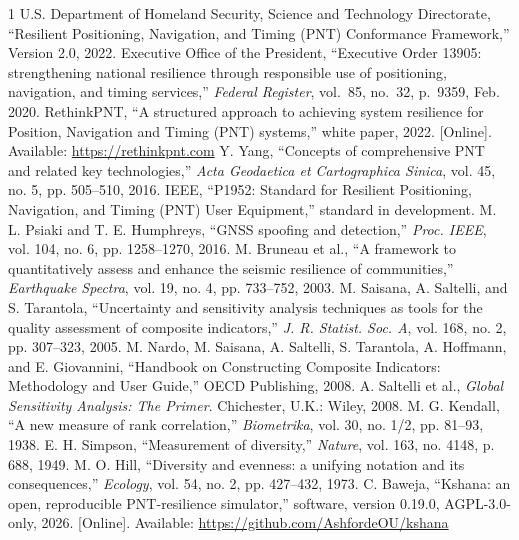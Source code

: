 \documentclass[conference]{IEEEtran}
\begin{document}
\begin{thebibliography}{1}
 U.S. Department of Homeland Security, Science and Technology Directorate, ``Resilient Positioning, Navigation, and Timing (PNT) Conformance Framework,'' Version 2.0, 2022.
 Executive Office of the President, ``Executive Order 13905: strengthening national resilience through responsible use of positioning, navigation, and timing services,'' \emph{Federal Register}, vol.~85, no.~32, p.~9359, Feb. 2020.
 RethinkPNT, ``A structured approach to achieving system resilience for Position, Navigation and Timing (PNT) systems,'' white paper, 2022. [Online]. Available: \url{https://rethinkpnt.com}
 Y. Yang, ``Concepts of comprehensive PNT and related key technologies,'' \emph{Acta Geodaetica et Cartographica Sinica}, vol. 45, no. 5, pp. 505--510, 2016.
 IEEE, ``P1952: Standard for Resilient Positioning, Navigation, and Timing (PNT) User Equipment,'' standard in development.
 M. L. Psiaki and T. E. Humphreys, ``GNSS spoofing and detection,'' \emph{Proc. IEEE}, vol. 104, no. 6, pp. 1258--1270, 2016.
 M. Bruneau et al., ``A framework to quantitatively assess and enhance the seismic resilience of communities,'' \emph{Earthquake Spectra}, vol. 19, no. 4, pp. 733--752, 2003.
 M. Saisana, A. Saltelli, and S. Tarantola, ``Uncertainty and sensitivity analysis techniques as tools for the quality assessment of composite indicators,'' \emph{J. R. Statist. Soc. A}, vol. 168, no. 2, pp. 307--323, 2005.
 M. Nardo, M. Saisana, A. Saltelli, S. Tarantola, A. Hoffmann, and E. Giovannini, ``Handbook on Constructing Composite Indicators: Methodology and User Guide,'' OECD Publishing, 2008.
 A. Saltelli et al., \emph{Global Sensitivity Analysis: The Primer}. Chichester, U.K.: Wiley, 2008.
 M. G. Kendall, ``A new measure of rank correlation,'' \emph{Biometrika}, vol. 30, no. 1/2, pp. 81--93, 1938.
 E. H. Simpson, ``Measurement of diversity,'' \emph{Nature}, vol. 163, no. 4148, p. 688, 1949.
 M. O. Hill, ``Diversity and evenness: a unifying notation and its consequences,'' \emph{Ecology}, vol. 54, no. 2, pp. 427--432, 1973.
 C. Baweja, ``Kshana: an open, reproducible PNT-resilience simulator,'' software, version 0.19.0, AGPL-3.0-only, 2026. [Online]. Available: \url{https://github.com/AshfordeOU/kshana}
\end{thebibliography}
\end{document}
